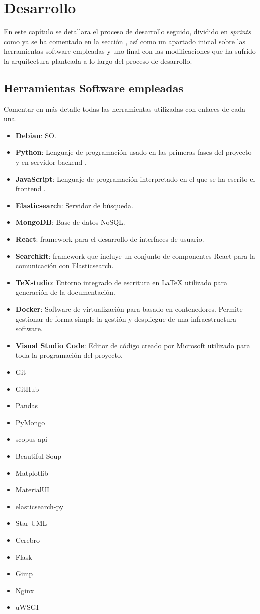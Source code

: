 \chapter{Desarrollo}
En este capítulo se detallara el proceso de desarrollo seguido, dividido en \textit{sprints} como ya se ha comentado en la sección , así como un apartado inicial sobre las herramientas software empleadas y uno final con las modificaciones que ha sufrido la arquitectura planteada a lo largo del proceso de desarrollo.

\section{Herramientas Software empleadas}
\label{ch:herramientas}

Comentar en más detalle todas las herramientas utilizadas con enlaces de cada una.

\begin{itemize}
	\item \textbf{Debian}: \acrfull{SO}.
	\item \textbf{Python}: Lenguaje de programación usado en las primeras fases del proyecto y en servidor \gls{backend} .
	\item \textbf{JavaScript}: Lenguaje de programación interpretado en el que se ha escrito el \gls{frontend} .
	\item \textbf{Elasticsearch}: Servidor de búsqueda.
	\item \textbf{MongoDB}: Base de datos NoSQL.
	\item \textbf{React}:  \Gls{framework} para el desarrollo de interfaces de usuario.
	\item \textbf{Searchkit}: \Gls{framework} que incluye un conjunto de componentes React para la comunicación con Elasticsearch.
	\item \textbf{TeXstudio}: Entorno integrado de escritura en \LaTeX{} utilizado para generación de la documentación.
	\item \textbf{Docker}: Software de virtualización para basado en contenedores. Permite gestionar de forma simple la gestión y despliegue de una infraestructura software.
	\item \textbf{Visual Studio Code}: Editor de código creado por Microsoft utilizado para toda la programación del proyecto.
	\item Git
	\item GitHub
	\item Pandas
	\item PyMongo
	\item scopus-api
	\item Beautiful Soup
	\item Matplotlib
	\item MaterialUI
	\item elasticsearch-py
	\item Star UML
	\item Cerebro
	\item Flask
	\item Gimp
	\item Nginx
	\item uWSGI
\end{itemize}

